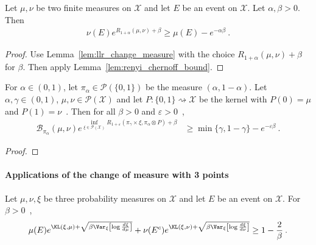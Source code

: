 \begin{lemma}
  \label{lem:renyi_change_measure}
  \leanok
  Let $\mu, \nu$ be two finite measures on $\mathcal X$ and let $E$ be an event on $\mathcal X$. Let $\alpha,\beta > 0$. Then
  \begin{align*}
  \nu(E) e^{R_{1+\alpha}(\mu, \nu) + \beta} \ge \mu(E) - e^{-\alpha \beta} \: .
  \end{align*}
\end{lemma}

\begin{proof}\leanok
{}
Use Lemma~\ref{lem:llr_change_measure} with the choice $R_{1+\alpha}(\mu, \nu) + \beta$ for $\beta$. Then apply Lemma~\ref{lem:renyi_chernoff_bound}.
\end{proof}


\begin{lemma}
  \label{lem:change_measure_risk_cgf}
  For $\alpha \in (0,1)$, let $\pi_\alpha \in \mathcal P(\{0,1\})$ be the measure $(\alpha, 1 - \alpha)$.
  Let $\alpha, \gamma \in (0,1)$, $\mu, \nu \in \mathcal P(\mathcal X)$ and let $P : \{0,1\} \rightsquigarrow \mathcal X$ be the kernel with $P(0) = \mu$ and $P(1) = \nu$~. Then for all $\beta > 0$ and $\varepsilon>0$~,
  \begin{align*}
  \mathcal B_{\pi_\alpha}(\mu, \nu) e^{\inf_{\xi \in \mathcal P(\mathcal X)} R_{1 + \varepsilon}(\pi_\gamma \times \xi, \pi_\alpha \otimes P) + \beta}
  &\ge \min\{\gamma, 1 - \gamma\} - e^{-\varepsilon \beta}
  \: .
  \end{align*}
\end{lemma}

\begin{proof}
\end{proof}



\paragraph{Applications of the change of measure with 3 points}

\begin{lemma}
  \label{lem:change_measure_variance_add}
  \uses{}
  Let $\mu, \nu, \xi$ be three probability measures on $\mathcal X$ and let $E$ be an event on $\mathcal X$. For $\beta > 0$~,
  \begin{align*}
  \mu(E) e^{\KL(\xi, \mu) + \sqrt{\beta \Var_{\xi}\left[\log\frac{d\xi}{d\mu}\right]}} + \nu(E^c) e^{\KL(\xi, \nu) + \sqrt{\beta \Var_{\xi}\left[\log\frac{d\xi}{d\nu}\right]}}
  \ge 1 - \frac{2}{\beta} \: .
  \end{align*}
\end{lemma}

